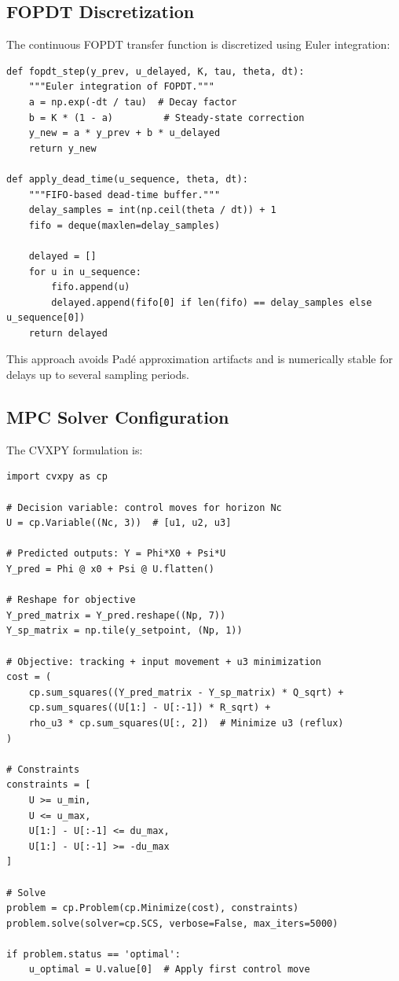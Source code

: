 \documentclass[conference]{IEEEtran}
\begin{document}
\subsection{FOPDT Discretization}

The continuous FOPDT transfer function is discretized using Euler integration:

\begin{lstlisting}[caption=FOPDT Discrete-Time Step]
def fopdt_step(y_prev, u_delayed, K, tau, theta, dt):
    """Euler integration of FOPDT."""
    a = np.exp(-dt / tau)  # Decay factor
    b = K * (1 - a)         # Steady-state correction
    y_new = a * y_prev + b * u_delayed
    return y_new

def apply_dead_time(u_sequence, theta, dt):
    """FIFO-based dead-time buffer."""
    delay_samples = int(np.ceil(theta / dt)) + 1
    fifo = deque(maxlen=delay_samples)

    delayed = []
    for u in u_sequence:
        fifo.append(u)
        delayed.append(fifo[0] if len(fifo) == delay_samples else u_sequence[0])
    return delayed
\end{lstlisting}

This approach avoids Padé approximation artifacts and is numerically stable for delays up to several sampling periods.

\subsection{MPC Solver Configuration}

The CVXPY formulation is:

\begin{lstlisting}[caption=MPC QP Formulation (CVXPY)]
import cvxpy as cp

# Decision variable: control moves for horizon Nc
U = cp.Variable((Nc, 3))  # [u1, u2, u3]

# Predicted outputs: Y = Phi*X0 + Psi*U
Y_pred = Phi @ x0 + Psi @ U.flatten()

# Reshape for objective
Y_pred_matrix = Y_pred.reshape((Np, 7))
Y_sp_matrix = np.tile(y_setpoint, (Np, 1))

# Objective: tracking + input movement + u3 minimization
cost = (
    cp.sum_squares((Y_pred_matrix - Y_sp_matrix) * Q_sqrt) +
    cp.sum_squares((U[1:] - U[:-1]) * R_sqrt) +
    rho_u3 * cp.sum_squares(U[:, 2])  # Minimize u3 (reflux)
)

# Constraints
constraints = [
    U >= u_min,
    U <= u_max,
    U[1:] - U[:-1] <= du_max,
    U[1:] - U[:-1] >= -du_max
]

# Solve
problem = cp.Problem(cp.Minimize(cost), constraints)
problem.solve(solver=cp.SCS, verbose=False, max_iters=5000)

if problem.status == 'optimal':
    u_optimal = U.value[0]  # Apply first control move
\end{lstlisting}
\end{document}
